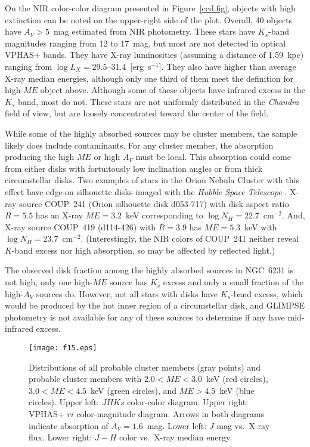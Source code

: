 \documentclass[twocolumn,tighten]{aastex61}
\begin{document}
On the NIR color-color diagram presented in Figure~\ref{ccd.fig}, objects with high extinction can be noted on the upper-right side of the plot. Overall, 40 objects have $A_V>5$~mag estimated from NIR photometry. These stars have $K_s$-band magnitudes ranging from 12 to 17~mag, but most are not detected in optical VPHAS+ bands. They have X-ray luminosities (assuming a distance of 1.59~kpc) ranging from $\log L_X=29.5$--31.4~[erg~s$^{-1}$]. They also have higher than average X-ray median energies, although only one third of them meet the definition for high-$ME$ object above. Although some of these objects have infrared excess in the $K_s$ band, most do not. These stars are not uniformly distributed in the {\it Chandra} field of view, but are loosely concentrated toward the center of the field.


While some of the highly absorbed sources may be cluster members, the sample likely does include contaminants. For any cluster member, the absorption producing the high $ME$ or high $A_V$ must be local. This absorption could come from either disks with fortuitously low inclination angles or from thick circumstellar disks.  Two examples of stars in the Orion Nebula Cluster with this effect have edge-on silhouette disks imaged with the {\it Hubble Space Telescope} \citep{2005ApJS..160..511K}.  X-ray source COUP~241 (Orion silhouette disk d053-717) with disk aspect ratio $R = 5.5$ has an X-ray $ME = 3.2$~keV corresponding to $\log N_H = 22.7$~cm$^{-2}$.  And, X-ray source COUP~419 (d114-426) with $R = 3.9$ has $ME = 5.3$~keV with $\log N_H = 23.7$~cm$^{-2}$. (Interestingly, the NIR colors of COUP~241 neither reveal $K$-band excess nor high absorption, so may be affected by reflected light.) 

The observed disk fraction among the highly absorbed sources in NGC~6231 is not high, only one high-$ME$ source has $K_s$ excess and only a small fraction of the high-$A_V$ sources do. However, not all stars with disks have $K_s$-band excess, which would be produced by the hot inner region of a circumstellar disk, and GLIMPSE photometry is not available for any of these sources to determine if any have mid-infrared excess.

\begin{figure*}
\centering
\texttt{[image: f15.eps]} 
\caption{Distributions of all probable cluster members (gray points) and probable cluster members with $2.0<ME<3.0$~keV (red circles), $3.0<ME<4.5$~keV (green circles), and $ME>4.5$~keV (blue circles). Upper left: $JHKs$ color-color diagram. Upper right: VPHAS+ $ri$ color-magnitude diagram. Arrows in both diagrams indicate absorption of $A_V=1.6$~mag. Lower left: $J$ mag vs.\ X-ray flux. Lower right: $J-H$ color vs.\ X-ray median energy.
 \label{hard.fig}}
\end{figure*}
\end{document}
